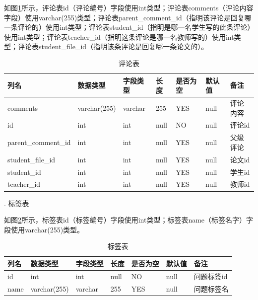如图\ref{db-comment}所示，评论表id（评论编号）字段使用int类型；评论表comments（评论内容字段）使用varchar(255)类型；评论表parent\_comment\_id（指明该评论是回复哪一条评论的）使用int类型；评论表student\_id（指明是哪一名学生写的此条评论）使用int类型；评论表teacher\_id（指明这条评论是哪一名教师写的）使用int类型；评论表student\_file\_id（指明该条评论是回复哪一条论文的）。
\begin{table}[htbp]
    \centering
    \song\wuhao
    \caption{评论表}
    \label{db-comment}
    \begin{tabular}{lllllll}
        \hline
        列名                & 数据类型     & 字段类型 & 长度 & 是否为空 & 默认值 & 备注     \\ \hline
        comments            & varchar(255) & varchar  & 255  & YES      & null   & 评论内容 \\
        id                  & int          & int      & null & NO       & null   & 评论id   \\
        parent\_comment\_id & int          & int      & null & YES      & null   & 父级评论 \\
        student\_file\_id   & int          & int      & null & YES      & null   & 论文id   \\
        student\_id         & int          & int      & null & YES      & null   & 学生id   \\
        teacher\_id         & int          & int      & null & YES      & null   & 教师id   \\ \hline
    \end{tabular}
\end{table}

.  标签表

如图\ref{db-tag}所示，标签表id（标签编号）字段使用int类型；标签表name（标签名字）字段使用varchar(255)类型。
\begin{table}[htbp]
    \centering
    \song\wuhao
    \caption{标签表}
    \label{db-tag}
    \begin{tabular}{lllllll}
        \hline
        列名 & 数据类型     & 字段类型 & 长度 & 是否为空 & 默认值 & 备注       \\ \hline
        id   & int          & int      & null & NO       & null   & 问题标签id \\
        name & varchar(255) & varchar  & 255  & YES      & null   & 问题标签名 \\ \hline
    \end{tabular}
\end{table}

